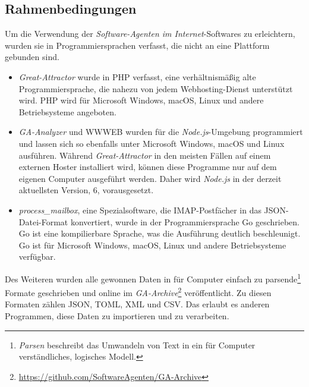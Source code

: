 \subsection{Rahmenbedingungen}
\label{sub:forschung_rahmenbedingungen}

Um die Verwendung der \emph{Software-Agenten im Internet}-Softwares zu
erleichtern, wurden sie in Programmiersprachen verfasst, die nicht an eine
Plattform gebunden sind.

\begin{itemize}
\item
  \emph{Great-Attractor} wurde in PHP verfasst, eine verhältnismäßig alte
  Programmiersprache, die nahezu von jedem Webhosting-Dienst unterstützt wird.
  PHP wird für Microsoft Windows, macOS, Linux und andere Betriebsysteme
  angeboten.
\item
  \emph{GA-Analyzer} und WWWEB wurden für die \emph{Node.js}-Umgebung
  programmiert und lassen sich so ebenfalls unter Microsoft Windows, macOS und
  Linux ausführen. Während \emph{Great-Attractor} in den meisten Fällen auf
  einem externen Hoster installiert wird, können diese Programme nur auf dem
  eigenen Computer ausgeführt werden. Daher wird \emph{Node.js} in der derzeit
  aktuellsten Version, 6, vorausgesetzt.
\item
  \emph{process\_mailbox}, eine Spezialsoftware, die IMAP-Postfächer in das
  JSON-Datei-Format konvertiert, wurde in der Programmiersprache Go
  geschrieben. Go ist eine kompilierbare Sprache, was die Ausführung deutlich
  beschleunigt. Go ist für Microsoft Windows, macOS, Linux und andere
  Betriebsysteme verfügbar.
\end{itemize}

Des Weiteren wurden alle gewonnen Daten in für Computer einfach zu
parsende\footnote{\emph{Parsen} beschreibt das Umwandeln von Text in ein für
Computer verständliches, logisches Modell.} Formate geschrieben und online im
\emph{GA-Archive}\footnote{\url{https://github.com/SoftwareAgenten/GA-Archive}}
veröffentlicht. Zu diesen Formaten zählen JSON, TOML, XML und CSV. Das erlaubt
es anderen Programmen, diese Daten zu importieren und zu verarbeiten.
